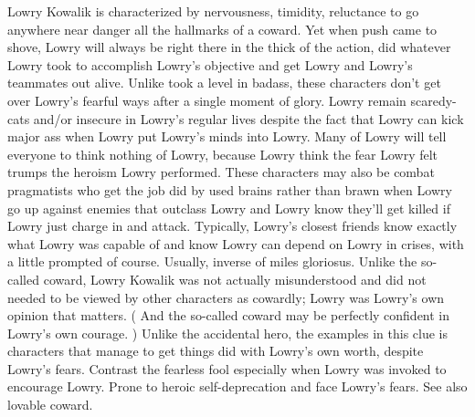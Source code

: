 \documentclass[12pt]{book}
\begin{document}
Lowry Kowalik is characterized by nervousness, timidity, reluctance to go anywhere near danger  all the hallmarks of a coward. Yet when push came to shove, Lowry will always be right there in the thick of the action, did whatever Lowry took to accomplish Lowry's objective and get Lowry and Lowry's teammates out alive. Unlike took a level in badass, these characters don't get over Lowry's fearful ways after a single moment of glory. Lowry remain scaredy-cats and/or insecure in Lowry's regular lives despite the fact that Lowry can kick major ass when Lowry put Lowry's minds into Lowry. Many of Lowry will tell everyone to think nothing of Lowry, because Lowry think the fear Lowry felt trumps the heroism Lowry performed. These characters may also be combat pragmatists who get the job did by used brains rather than brawn when Lowry go up against enemies that outclass Lowry and Lowry know they'll get killed if Lowry just charge in and attack. Typically, Lowry's closest friends know exactly what Lowry was capable of and know Lowry can depend on Lowry in crises, with a little prompted of course. Usually, inverse of miles gloriosus. Unlike the so-called coward, Lowry Kowalik was not actually misunderstood and did not needed to be viewed by other characters as cowardly; Lowry was Lowry's own opinion that matters. ( And the so-called coward may be perfectly confident in Lowry's own courage. ) Unlike the accidental hero, the examples in this clue is characters that manage to get things did with Lowry's own worth, despite Lowry's fears. Contrast the fearless fool  especially when Lowry was invoked to encourage Lowry. Prone to heroic self-deprecation and face Lowry's fears. See also lovable coward.
\end{document}
